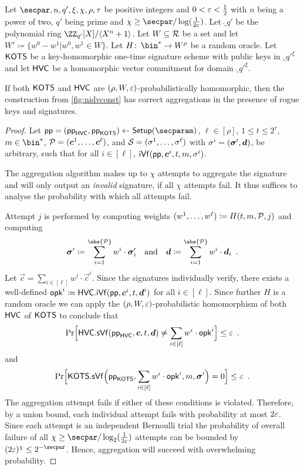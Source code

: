 \begin{lemma}\label{lem:msigaggcorrect}
Let $\secpar,n,q',\xi,\chi,\rho,\tau$ be positive integers and $0 < \varepsilon < \tfrac{1}{2}$ with $n$ being a power of two, $q'$ being prime and $\chi \geq \secpar/\log(\tfrac{1}{2\errorbound})$.
Let $\ring_{q'}$ be the polynomial ring $\defringqq$.
Let $W \subseteq \mathcal{R}$ be a set and let $W' \coloneqq \{w^0-w^1| w^0,w^1 \in W\}$.
Let $H\colon\, \bin^* \to W^\rho$ be a random oracle.
Let $\mathsf{KOTS}$ be a key-homomorphic one-time signature scheme with public keys in $\ring_{q'}^\xi$ and let $\mathsf{HVC}$ be a homomorphic vector commitment for domain $\ring_{q'}^\xi$.

If both $\mathsf{KOTS}$ and $\mathsf{HVC}$ are $(\rho,W,\varepsilon)$-probabilistically homomorphic, then the construction from \autoref{fig:nidvconst} has correct aggregations in the presence of rogue keys and signatures.
\end{lemma}
\begin{proof}
  Let $\params = (\params_\hvc,\params_\hots)\gets\setup(\secparam)$, $\ell \in [\rho]$, $1\leq t\leq 2^\tau$, $m\in\bin^*$, $\mathcal{P} = (\boldsymbol{c}^1,\dots,\boldsymbol{c}^\ell)$, and $\mathcal{S} = (\sigma^1,\dots,\sigma^\ell)$ with 
  $\sigma^i=(\boldsymbol{\sigma}',\boldsymbol{d})$, be arbitrary, such that for all $i\in[\ell]$, $\mathsf{iVf}(\mathsf{pp},\boldsymbol{c}^i,t,m,\sigma^i)$.
  
  The aggregation algorithm makes up to $\chi$ attempts to aggregate the signature and will only output an \emph{invalid} signature, if all $\chi$ attempts fail.
  It thus suffices to analyse the probability with which all attempts fail.
  
  Attempt $j$ is performed by computing weights $(w^1,\dots,w^\ell) \coloneqq H(t,m,\mathcal{P},j)$ and computing 
  \[
    \otsig \coloneqq \sum_{i=1}^{\abs{\pubkeys}} w^i\cdot \otsig_i \quad \text{and}\quad \vec{d} \coloneqq \sum_{i=1}^{\abs{\pubkeys}} w^i\cdot \vec{d}_i\enspace.
  \]
  Let $\vec{c} = \sum_{i\in[\ell]}w^i\cdot\vec{c}^i$.
  Since the signatures individually verify, there exists a well-defined $\mathsf{opk}^i \coloneqq \mathsf{HVC}.\mathsf{iVf}(\mathsf{pp},\boldsymbol{c}^i,t,\boldsymbol{d}^i)$ for all $i\in[\ell]$.
  Since further $H$ is a random oracle we can apply the $(\rho,W,\varepsilon)$-probabilistic homomorphism of both $\mathsf{HVC}$ of $\mathsf{KOTS}$ to conclude that
  \[
    \Pr\Bigl[\mathsf{HVC}.\mathsf{sVf}(\mathsf{pp}_{\mathsf{HVC}},\boldsymbol{c},t,\boldsymbol{d}) \neq \sum_{i\in[\ell]} w^i\cdot\mathsf{opk}^i\Bigr] \leq \varepsilon \enspace.
  \]
  and
  \[
    \Pr\Bigl[\mathsf{KOTS}.\mathsf{sVf}\Bigl(\mathsf{pp}_{\mathsf{KOTS}},\sum_{i\in[\ell]} w^i\cdot\mathsf{opk}^i, m, \boldsymbol{\sigma}'\Bigr) = 0\Bigr] \leq \varepsilon\enspace.
  \]
  The aggregation attempt fails if either of these conditions is violated.
  Therefore, by a union bound, each individual attempt fails with probability at most $2\varepsilon$.
  Since each attempt is an independent Bernoulli trial the probability of overall failure of all $\chi\geq \secpar/\log_2(\tfrac{1}{2\errorbound})$ attempts can be bounded by $(2\errorbound)^{\chi} \leq 2^{-\secpar}$.
  Hence, aggregation will succeed with overwhelming probability.
\end{proof}

